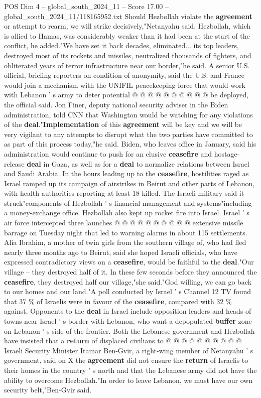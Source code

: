 \begin{textsample}{POS Dim 4 – global\_south\_2024\_11 – Score 17.00 – global\_south\_2024\_11/118165952.txt}
Should Hezbollah violate the \textbf{agreement} or attempt to rearm, we will strike decisively,"Netanyahu said.
Hezbollah, which is allied to Hamas, was considerably weaker than it had been at the start of the conflict, he added."We have set it back decades, eliminated... its top leaders, destroyed most of its rockets and missiles, neutralized thousands of fighters, and obliterated years of terror infrastructure near our border,"he said.
A senior U.S. official, briefing reporters on condition of anonymity, said the U.S. and France would join a mechanism with the UNIFIL peacekeeping force that would work with Lebanon ' s army to deter potential @ @ @ @ @ @ @ @ @ @ be deployed, the official said.
Jon Finer, deputy national security adviser in the Biden administration, told CNN that Washington would be watching for any violations of the \textbf{deal}."\textbf{Implementation} of this \textbf{agreement} will be key and we will be very vigilant to any attempts to disrupt what the two parties have committed to as part of this process today,"he said.
Biden, who leaves office in January, said his administration would continue to push for an elusive \textbf{ceasefire} and hostage-release \textbf{deal} in Gaza, as well as for a \textbf{deal} to normalize relations between Israel and Saudi Arabia.
In the hours leading up to the \textbf{ceasefire}, hostilities raged as Israel ramped up its campaign of airstrikes in Beirut and other parts of Lebanon, with health authorities reporting at least 18 killed.
The Israeli military said it struck"components of Hezbollah ' s financial management and systems"including a money-exchange office.
Hezbollah also kept up rocket fire into Israel.
Israel ' s air force intercepted three launches @ @ @ @ @ @ @ @ @ @ extensive missile barrage on Tuesday night that led to warning alarms in about 115 settlements.
Alia Ibrahim, a mother of twin girls from the southern village of, who had fled nearly three months ago to Beirut, said she hoped Israeli officials, who have expressed contradictory views on a \textbf{ceasefire}, would be faithful to the \textbf{deal}."Our village -- they destroyed half of it.
In these few seconds before they announced the \textbf{ceasefire}, they destroyed half our village,"she said."God willing, we can go back to our homes and our land."A poll conducted by Israel ' s Channel 12 TV found that 37 \% of Israelis were in favour of the \textbf{ceasefire}, compared with 32 \% against.
Opponents to the \textbf{deal} in Israel include opposition leaders and heads of towns near Israel ' s border with Lebanon, who want a depopulated \textbf{buffer} zone on Lebanon ' s side of the frontier.
Both the Lebanese government and Hezbollah have insisted that a \textbf{return} of displaced civilians to @ @ @ @ @ @ @ @ @ @ Israeli Security Minister Itamar Ben-Gvir, a right-wing member of Netanyahu ' s government, said on X the \textbf{agreement} did not ensure the \textbf{return} of Israelis to their homes in the country ' s north and that the Lebanese army did not have the ability to overcome Hezbollah."In order to leave Lebanon, we must have our own security belt,"Ben-Gvir said.


\end{textsample}

